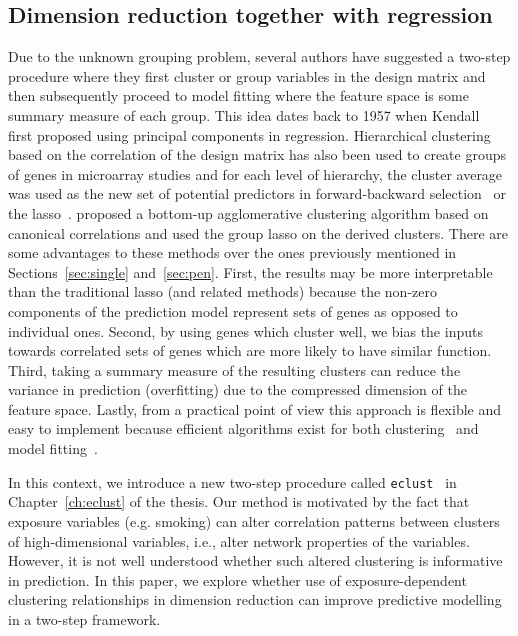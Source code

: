 \subsection{Dimension reduction together with regression}
Due to the unknown grouping problem, several authors have suggested a two-step procedure where they first cluster or group variables in the design matrix and then subsequently proceed to model fitting where the feature space is some summary measure of each group. 
This idea dates back to 1957 when Kendall~\citep{kendall1975multivariate} first proposed using principal components in regression. 
Hierarchical clustering based on the correlation of the design matrix has also been used to create groups of genes in microarray studies and for each level of hierarchy, the cluster average was used as the new set of potential predictors in forward-backward selection~\citep{hastie2001supervised} or the lasso~\citep{park2007averaged}.
\cite{buhlmann2013correlated} proposed a bottom-up agglomerative clustering algorithm based on canonical correlations and used the group lasso on the derived clusters. 
There are some advantages to these methods over the ones previously mentioned in Sections~\ref{sec:single} and~\ref{sec:pen}. 
First, the results may be more interpretable than the traditional lasso (and related methods) because the non-zero components of the prediction model represent sets of genes as opposed to individual ones. 
Second, by using genes which cluster well, we bias the inputs towards correlated sets of genes which are more likely to have similar function. 
Third, taking a summary measure of the resulting clusters can reduce the variance in prediction (overfitting) due to the compressed dimension of the feature space. 
Lastly, from a practical point of view this approach is flexible and easy to implement because efficient algorithms exist for both clustering~\citep{fastclust} and model fitting~\citep{friedman2010regularization,gglasso}. 

In this context, we introduce a new two-step procedure called \texttt{eclust}~\citep{bhatnagar2018analytic} in Chapter~\ref{ch:eclust} of the thesis. Our method is motivated by the fact that exposure variables (e.g. smoking) can alter correlation patterns between clusters of high-dimensional variables, i.e., alter network properties of the variables. However, it is not well understood whether such altered clustering is informative in prediction. In this paper, we explore whether use of exposure-dependent clustering relationships in dimension reduction can improve predictive modelling in a two-step framework. 

